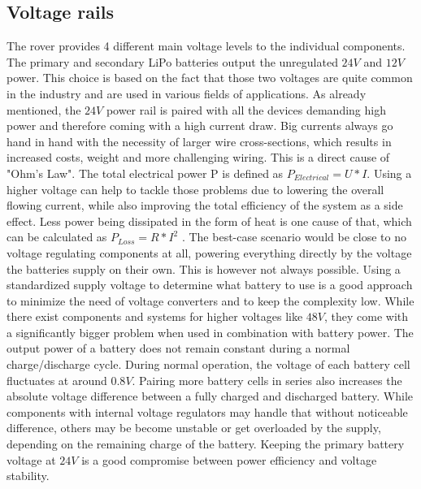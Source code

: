     \clearpage %

    \subsection{Voltage rails}

    The rover provides 4 different main voltage levels to the individual components. The primary and secondary LiPo batteries output the unregulated $24V$ and $12V$ power. This choice is based on the fact that those two voltages are quite common in the industry and are used in various fields of applications. As already mentioned, the $24V$ power rail is paired with all the devices demanding high power and therefore coming with a high current draw. Big currents always go hand in hand with the necessity of larger wire cross-sections, which results in increased costs, weight and more challenging wiring. This is a direct cause of "Ohm's Law". The total electrical power P is defined as $P_{Electrical}=U*I$. Using a higher voltage can help to tackle those problems due to lowering the overall flowing current, while also improving the total efficiency of the system as a side effect. Less power being dissipated in the form of heat is one cause of that, which can be calculated as $P_{Loss}=R*I^2$ . The best-case scenario would be close to no voltage regulating components at all, powering everything directly by the voltage the batteries supply on their own. This is however not always possible. Using a standardized supply voltage to determine what battery to use is a good approach to minimize the need of voltage converters and to keep the complexity low. While there exist components and systems for higher voltages like $48V$, they come with a significantly bigger problem when used in combination with battery power. The output power of a battery does not remain constant during a normal charge/discharge cycle. During normal operation, the voltage of each battery cell fluctuates at around $0.8V$. Pairing more battery cells in series also increases the absolute voltage difference between a fully charged and discharged battery. While components with internal voltage regulators may handle that without noticeable difference, others may be become unstable or get overloaded by the supply, depending on the remaining charge of the battery. Keeping the primary battery voltage at $24V$ is a good compromise between power efficiency and voltage stability. 

    \vspace{5mm} %

